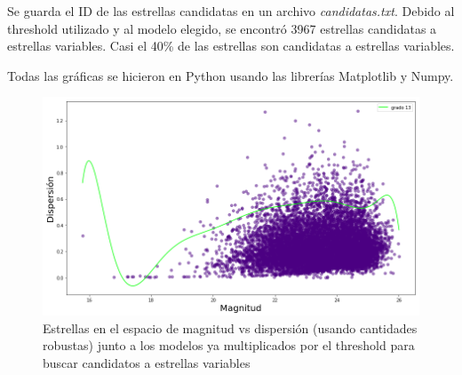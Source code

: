 \documentclass[12pt]{article}
\begin{document}
Se guarda el ID de las estrellas candidatas en un archivo \emph{candidatas.txt}. Debido al threshold utilizado y al modelo elegido, se encontró 3967 estrellas candidatas a estrellas variables. Casi el 40\% de las estrellas son candidatas a estrellas variables.

Todas las gráficas se hicieron en Python usando las librerías Matplotlib y Numpy.

\begin{figure}[ht!]
  \centering
   \includegraphics[scale = 0.6]{fits2.png}
  \caption{Estrellas en el espacio de magnitud vs dispersión (usando cantidades robustas) junto a los modelos ya multiplicados por el threshold para buscar candidatos a estrellas variables }
  \label{figura2}
\end{figure}


%

\end{document}
